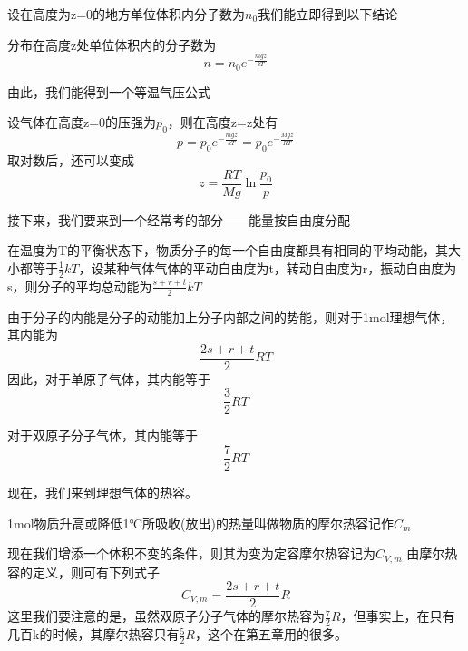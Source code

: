 \documentclass[lang=cn,10pt]{elegantbook}
\begin{document}
	设在高度为z=0的地方单位体积内分子数为$n_{0}$我们能立即得到以下结论
	\begin{conclusion}
		分布在高度z处单位体积内的分子数为
		\begin{equation*}
			n=n_{0}e^{-\frac{mgz}{kT}}
		\end{equation*}
	\end{conclusion}
	
	由此，我们能得到一个等温气压公式
	\begin{theorem}[等温气压公式]
		设气体在高度z=0的压强为$p_{0}$，则在高度z=z处有
		\begin{equation*}
			p=p_{0}e^{-\frac{mgz}{kT}}=p_{0}e^{-\frac{Mgz}{RT}}
		\end{equation*}
		取对数后，还可以变成
		\begin{equation*}
			z=\frac{RT}{Mg}\ln \frac{p_0}{p}
		\end{equation*}
	\end{theorem}
	
	接下来，我们要来到一个经常考的部分——能量按自由度分配
	
	\begin{theorem}[能均分定理]
		在温度为T的平衡状态下，物质分子的每一个自由度都具有相同的平均动能，其大小都等于$\frac{1}{2}kT$，设某种气体气体的平动自由度为t，转动自由度为r，振动自由度为s，则分子的平均总动能为$\frac{s+r+t}{2}kT$
	\end{theorem}
	
	由于分子的内能是分子的动能加上分子内部之间的势能，则对于1mol理想气体，其内能为
	\begin{equation*}
		\frac{2s+r+t}{2}RT
	\end{equation*}
	因此，对于单原子气体，其内能等于
	\begin{equation*}
		\frac{3}{2}RT
	\end{equation*}
	
	对于双原子分子气体，其内能等于
	 \begin{equation*}
	 	\frac{7}{2}RT
	 \end{equation*}
	 
	 现在，我们来到理想气体的热容。
	 
	 \begin{definition}[摩尔热容]
	 	1mol物质升高或降低1$℃$所吸收(放出)的热量叫做物质的摩尔热容记作$C_{m}$
	 \end{definition}
	 现在我们增添一个体积不变的条件，则其为变为定容摩尔热容记为$C_{V,m}$
	 由摩尔热容的定义，则可有下列式子
	 \begin{equation*}
	 	C_{V,m}=\frac{2s+r+t}{2}R
	 \end{equation*}
	 这里我们要注意的是，虽然双原子分子气体的摩尔热容为$\frac{7}{2}R $，但事实上，在只有几百k的时候，其摩尔热容只有$\frac{5}{2}R$，这个在第五章用的很多。
	 
\end{document}
